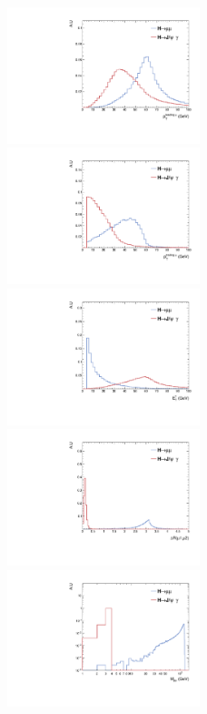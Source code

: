 \begin{figure}[p]
  \begin{center}  
    \includegraphics[width=0.5\textwidth]{Fig/GenLevel_Hmumu/Hmumu_mu1Pt}~
    \includegraphics[width=0.5\textwidth]{Fig/GenLevel_Hmumu/Hmumu_mu2Pt}\\
    \includegraphics[width=0.5\textwidth]{Fig/GenLevel_Hmumu/Hmumu_phoEt}~
    \includegraphics[width=0.5\textwidth]{Fig/GenLevel_Hmumu/Hmumu_dRdimuon}\\
    \includegraphics[width=0.5\textwidth]{Fig/GenLevel_Hmumu/Hmumu_Mmumu}~

\end{center}
\end{figure}
